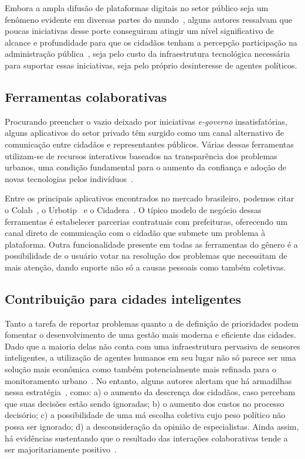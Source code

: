 \documentclass{sigchi}
\begin{document}
Embora a ampla difusão de plataformas digitais no setor público seja um fenômeno evidente em diversas partes do mundo~\cite{nam:2011}, alguns autores ressalvam que poucas iniciativas desse porte conseguiram atingir um nível significativo de alcance e profundidade para que os cidadãos tenham a percepção participação na administração pública~\cite{layne:2001}, seja pelo custo da infraestrutura tecnológica necessária para suportar essas iniciativas, seja pelo próprio desinteresse de agentes políticos.

\subsection{Ferramentas colaborativas}
Procurando preencher o vazio deixado por iniciativas \textit{e-governo} insatisfatórias, alguns aplicativos do setor privado têm surgido como um canal alternativo de comunicação entre cidadãos e representantes públicos. Várias dessas ferramentas utilizam-se de recursos interativos baseados na transparência dos problemas urbanos, uma condição fundamental para o aumento da confiança e adoção de novas tecnologias pelos indivíduos~\cite{carter:2005}.

Entre os principais aplicativos encontrados no mercado brasileiro, podemos citar o Colab~\cite{colab:2016}, o Urbotip~\cite{urbotip:2016} e o Cidadera~\cite{cidadera:2016}. O típico modelo de negócio dessas ferramentas é estabelecer parcerias contratuais com prefeituras, oferecendo um canal direto de comunicação com o cidadão que submete um problema à plataforma. Outra funcionalidade presente em todas as ferramentas do gênero é a possibilidade de o usuário votar na resolução dos problemas que necessitam de mais atenção, dando suporte não só a causas pessoais como também coletivas. 

\subsection{Contribuição para cidades inteligentes}
Tanto a tarefa de reportar problemas quanto a de definição de prioridades podem fomentar o desenvolvimento de uma gestão mais moderna e eficiente das cidades. Dado que a maioria delas não conta com uma infraestrutura pervasiva de sensores inteligentes, a utilização de agentes humanos em seu lugar não só parece ser uma solução mais econômica como também potencialmente mais refinada para o monitoramento urbano~\cite{zambonelli:2011}. No entanto, alguns autores alertam que há armadilhas nessa estratégia~\cite{irvin:2004, brabham:2009}, como: a) o aumento da descrença dos cidadãos, caso percebam que suas decisões estão sendo ignoradas; b) o aumento dos custos no processo decisório; c) a possibilidade de uma má escolha coletiva cujo peso político não possa ser ignorado; d) a desconsideração da opinião de especialistas. Ainda assim, há evidências sustentando que o resultado das interações colaborativas tende a ser majoritariamente positivo~\cite{schuurman:2012}.
\end{document}
